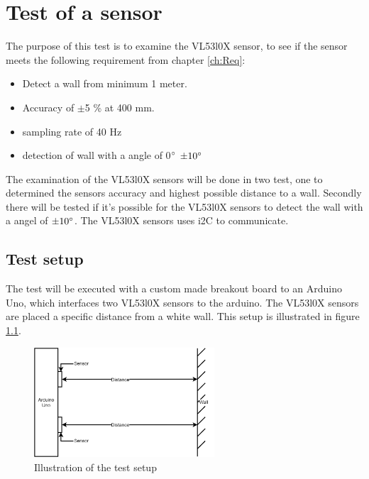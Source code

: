 \chapter{Test of a sensor}\label{ap:testOfSensors}

%
The purpose of this test is to examine the VL53l0X sensor, to see if the sensor meets the following requirement from chapter \ref{ch:Req}:
\begin{itemize}
    \item Detect a wall from minimum 1 meter.
    \item Accuracy of $\pm$5 \% at 400 mm.
    \item sampling rate of 40 Hz
    \item detection of wall with a angle of 0$\degree$ $\pm 10 \degree$
\end{itemize}
The examination of the VL53l0X sensors will be done in two test, one to determined the sensors accuracy and highest possible distance to a wall. Secondly there will be tested if it's possible for the VL53l0X sensors to detect the wall with a angel of $\pm 10 \degree$.
The VL53l0X sensors uses i2C to communicate.

%
\section*{Test setup}
The test will be executed with a custom made breakout board to an Arduino Uno, which interfaces two VL53l0X sensors to the arduino. The VL53l0X sensors are placed a specific distance from a white wall. This setup is illustrated in figure \ref{fig:testSetupSensor}.
\begin{figure}[H]
    \centering
    \includegraphics[width=0.6\textwidth]{figures/Appendix/testopstillingSensor.png}
    \caption{Illustration of the test setup}
    \label{fig:testSetupSensor}
\end{figure}

